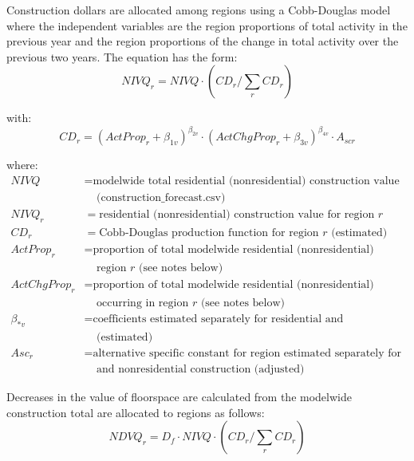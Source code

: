 Construction dollars are allocated among regions using a Cobb-Douglas model where the independent variables are the region proportions of total activity in the previous year and the region proportions of the change in total activity over the previous two years. The equation has the form:
\begin{equation}\label{eq:5.01}  %
NIVQ_r = NIVQ \cdot \left( CD_r / \sum_r{CD_r} \right)
\end{equation}

\noindent with:
\begin{equation}\label{eq:5.02}   %
CD_r = (ActProp_r + \beta_{1v})^{\beta_{2v}} \cdot (ActChgProp_r + \beta_{3v})^{\beta_{4v}} \cdot A_{scr}
\end{equation}

\noindent where:
\begin{align*}
NIVQ &= \text{modelwide total residential (nonresidential) construction value by year from NED} \\
 &~~~~~\text{(construction\_forecast.csv)} \\
NIVQ_r &= \text{residential (nonresidential) construction value for region $r$} \\
CD_r &= \text{Cobb-Douglas production function for region $r$ (estimated)} \\
ActProp_r &= \text{proportion of total modelwide residential (nonresidential) activity occurring in} \\
 &~~~~~\text{region $r$ (see notes below)} \\
ActChgProp_r &= \text{proportion of total modelwide residential (nonresidential) activity change} \\
 &~~~~~\text{occurring in region $r$ (see notes below)} \\
\beta_{*v} &= \text{coefficients estimated separately for residential and nonresidential construction} \\
 &~~~~~\text{(estimated)} \\
Asc_r &= \text{alternative specific constant for region estimated separately for residential} \\
 &~~~~~\text{and nonresidential construction (adjusted)}
\end{align*}

\noindent Decreases in the value of floorspace are calculated from the modelwide construction total are allocated to regions as follows:
\begin{equation}\label{eq:5.03}  %
NDVQ_r = D_f \cdot NIVQ \cdot \left( CD_r / \sum_r{CD_r} \right)
\end{equation}

